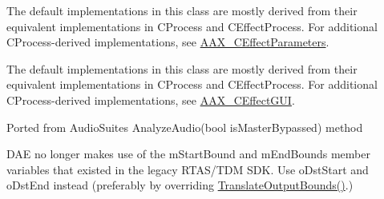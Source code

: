 
\begin{DoxyRefList}
\item[Class \mbox{\hyperlink{a01848}{AAX\+\_\+\+CEffect\+GUI}} ]\label{a00880__porting_notes000005}%
%
 The default implementations in this class are mostly derived from their equivalent implementations in CProcess and CEffect\+Process. For additional CProcess-\/derived implementations, see \mbox{\hyperlink{a01852}{AAX\+\_\+\+CEffect\+Parameters}}. 
\item[Class \mbox{\hyperlink{a01852}{AAX\+\_\+\+CEffect\+Parameters}} ]\label{a00880__porting_notes000006}%
%
 The default implementations in this class are mostly derived from their equivalent implementations in CProcess and CEffect\+Process. For additional CProcess-\/derived implementations, see \mbox{\hyperlink{a01848}{AAX\+\_\+\+CEffect\+GUI}}. 
\item[Member \mbox{\hyperlink{a01856_a2da61261e2d09dbafe37fa94ca39da07}{AAX\+\_\+\+CHost\+Processor\+::Analyze\+Audio}} (const float $\ast$const in\+Audio\+Ins\mbox{[}\mbox{]}, int32\+\_\+t in\+Audio\+In\+Count, int32\+\_\+t $\ast$io\+Window\+Size) AAX\+\_\+\+OVERRIDE]\label{a00880__porting_notes000009}%
%
 Ported from Audio\+Suite\textquotesingle{}s {\ttfamily Analyze\+Audio}(bool {\ttfamily is\+Master\+Bypassed}) method 
\item[Member \mbox{\hyperlink{a01856_a8beff35a046a1b3c780b1ecc1ded7e6e}{AAX\+\_\+\+CHost\+Processor\+::Init\+Output\+Bounds}} (int64\+\_\+t i\+Src\+Start, int64\+\_\+t i\+Src\+End, int64\+\_\+t $\ast$o\+Dst\+Start, int64\+\_\+t $\ast$o\+Dst\+End) AAX\+\_\+\+OVERRIDE]\label{a00880__porting_notes000007}%
%
 DAE no longer makes use of the m\+Start\+Bound and m\+End\+Bounds member variables that existed in the legacy RTAS/\+TDM SDK. Use {\ttfamily o\+Dst\+Start} and {\ttfamily o\+Dst\+End} instead (preferably by overriding \mbox{\hyperlink{a01856_a4d793e60071069e6f98c4d841d37ac96}{Translate\+Output\+Bounds()}}.) 
\item[Member \mbox{\hyperlink{a01856_ac0db2ad67d5fc29dab0b548f937c079a}{AAX\+\_\+\+CHost\+Processor\+::Render\+Audio}} (const float $\ast$const in\+Audio\+Ins\mbox{[}\mbox{]}, int32\+\_\+t in\+Audio\+In\+Count, float $\ast$const i\+Audio\+Outs\mbox{[}\mbox{]}, int32\+\_\+t i\+Audio\+Out\+Count, int32\+\_\+t $\ast$io\+Window\+Size) AAX\+\_\+\+OVERRIDE]\label{a00880__porting_notes000008}%
%

\end{DoxyRefList}
